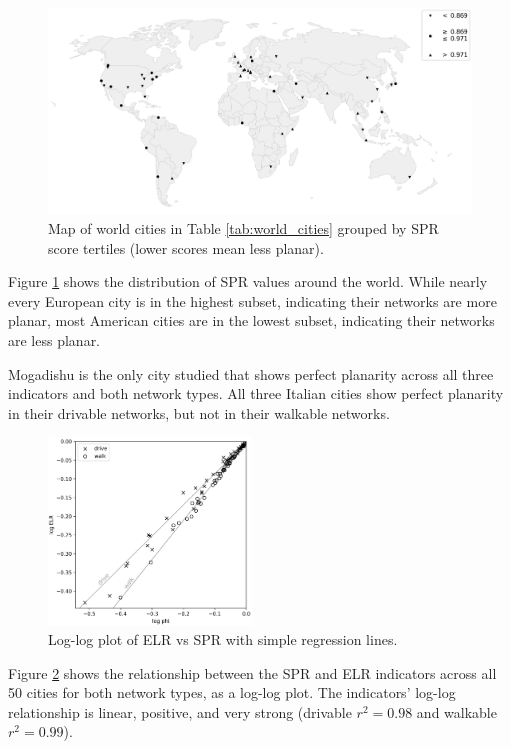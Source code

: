 \documentclass[Afour,sageh,times]{sagej}
\begin{document}
\begin{figure}[htbp]
	\center
	\includegraphics[width=\textwidth]{world_map_phi_bw.png}
	\caption{Map of world cities in Table \ref{tab:world_cities} grouped by SPR score tertiles (lower scores mean less planar).}
	\label{fig:world_map_bw}
\end{figure}

Figure \ref{fig:world_map_bw} shows the distribution of SPR values around the world. While nearly every European city is in the highest subset, indicating their networks are more planar, most American cities are in the lowest subset, indicating their networks are less planar.

Mogadishu is the only city studied that shows perfect planarity across all three indicators and both network types. All three Italian cities show perfect planarity in their drivable networks, but not in their walkable networks.

\begin{figure}[htbp]
	\includegraphics[width=0.48\textwidth]{regression_phi_split.png}
	\caption{Log-log plot of ELR vs SPR with simple regression lines.}
	\label{fig:regression_split}
\end{figure}

Figure \ref{fig:regression_split} shows the relationship between the SPR and ELR indicators across all 50 cities for both network types, as a log-log plot. The indicators' log-log relationship is linear, positive, and very strong (drivable $r^2=0.98$ and walkable $r^2=0.99$).
\end{document}
